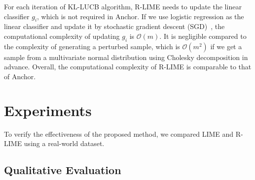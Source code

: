 \documentclass[runningheads]{llncs}
\begin{document}
{For each iteration of KL-LUCB algorithm, R-LIME needs to update
the linear classifier $g_i$, which is not required in Anchor.
If we use logistic regression as the linear classifier and update it
by stochastic gradient descent (SGD)~\cite{robbins1951stochastic},
the computational complexity of updating $g_i$ is $\mathcal{O}(m)$.
It is negligible compared to the complexity of generating a perturbed sample,
which is $\mathcal{O}(m^2)$ if we get a sample
from a multivariate normal distribution using Cholesky decomposition in advance.
Overall, the computational complexity of R-LIME is comparable to that of Anchor.

\section{Experiments}
To verify the effectiveness of the proposed method,
we compared LIME and R-LIME using a real-world dataset.

\subsection{Qualitative Evaluation}\label{sec:exp-qual}
}
\end{document}
